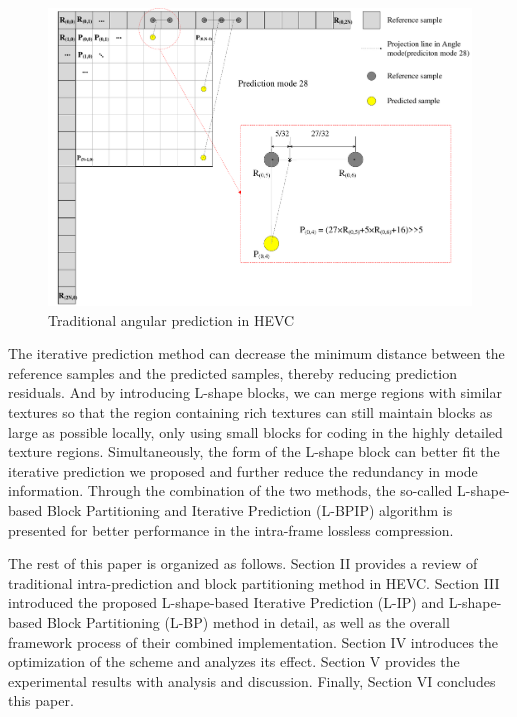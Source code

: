 \documentclass[journal]{IEEEtran}
\begin{document}
\begin{figure}[htpb]
\centering
\includegraphics[width=14cm]{pictures/HEVCprediction}
\caption{Traditional angular prediction in HEVC}

\label{fig:HEVCprediction}
\end{figure}

The iterative prediction method can decrease the minimum distance between the reference samples and the predicted samples, thereby reducing prediction residuals. And by introducing L-shape blocks, we can merge regions with similar textures so that the region containing rich textures can still maintain blocks as large as possible locally, only using small blocks for coding in the highly detailed texture regions. Simultaneously, the form of the L-shape block can better fit the iterative prediction we proposed and further reduce the redundancy in mode information. Through the combination of the two methods, the so-called L-shape-based Block Partitioning and Iterative Prediction (L-BPIP) algorithm is presented for better performance in the intra-frame lossless compression.

The rest of this paper is organized as follows. Section II provides a review of traditional intra-prediction and block partitioning method in HEVC. Section III introduced the proposed L-shape-based Iterative Prediction (L-IP) and L-shape-based Block Partitioning (L-BP) method in detail, as well as the overall framework process     of their combined implementation. Section IV introduces the optimization of the scheme and analyzes its effect. Section V provides the experimental results with analysis and discussion. Finally, Section VI concludes this paper.
\end{document}
